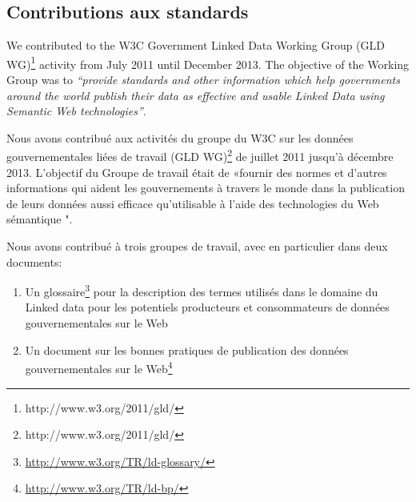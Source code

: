 \documentclass[a4paper,11pt,twoside]{report}
\begin{document}
\subsection*{Contributions aux standards}
\label{sec:contrib-standard}
We contributed to the W3C Government Linked Data Working Group (GLD WG)\footnote{http://www.w3.org/2011/gld/} activity from July 2011 until December 2013.  The objective of the Working Group was to \textit{``provide standards and other information which help governments around the world publish their data as effective and usable Linked Data using Semantic Web technologies''}.

Nous avons contribué aux activités du groupe du W3C sur les données gouvernementales liées de travail (GLD WG)\footnote{http://www.w3.org/2011/gld/} de juillet 2011 jusqu'à décembre 2013. L'objectif du Groupe de travail était de «fournir des normes et d'autres informations qui aident les gouvernements à travers le monde dans la publication de leurs données aussi efficace qu'utilisable à l'aide des technologies du Web sémantique ".

Nous avons contribué à trois groupes de travail, avec en particulier dans deux documents:
\begin{enumerate}
\item Un glossaire\footnote{\url{http://www.w3.org/TR/ld-glossary/}} pour la description des termes utilisés dans le domaine du Linked data pour les potentiels producteurs et consommateurs de données gouvernementales sur le Web
\item Un document sur les bonnes pratiques de publication des données gouvernementales sur le Web\footnote{\url{http://www.w3.org/TR/ld-bp/}}

\end{enumerate}
\end{document}
